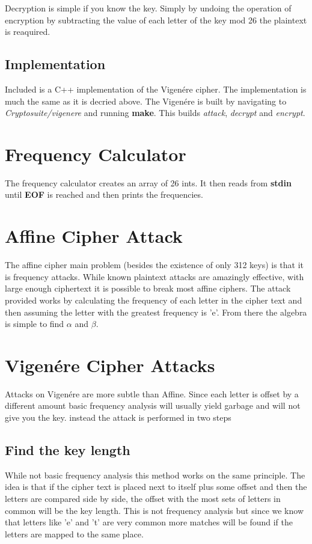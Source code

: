 Decryption is simple if you know the key. 
Simply by undoing the operation of encryption by subtracting the value of each letter of the key mod 26 the plaintext is reaquired.

\subsection{ Implementation}

Included is a C++ implementation of the Vigen\'ere cipher.
The implementation is much the same as it is decried above.
The Vigen\'ere is built by navigating to \textit{Cryptosuite/vigenere} and running \textbf{make}. This builds \textit{attack}, \textit{decrypt} and \textit{encrypt}.

\section{Frequency Calculator}
The frequency calculator creates an array of 26 ints. It then reads from \textbf{stdin} until \textbf{EOF} is reached and then prints the frequencies.

\section{Affine Cipher Attack}

The affine cipher main problem (besides the existence of only 312 keys) is that it is frequency attacks.
While known plaintext attacks are amazingly effective, with large enough ciphertext it is possible to break most affine ciphers.
The attack provided works by calculating the frequency of each letter in the cipher text and then assuming the letter with the greatest frequency is 'e'.
From there the algebra is simple to find $\alpha$ and $\beta$.


\section{Vigen\'ere Cipher Attacks}

Attacks on Vigen\'ere are more subtle than Affine.
Since each letter is offset by a different amount basic frequency analysis will usually yield garbage and will not give you the key.
instead the attack is performed in two steps

\subsection{Find the key length}
While not basic frequency analysis this method works on the same principle.
The idea is that if the cipher text is placed next to itself plus some offset and then the letters are compared side by side, 
the offset with the most sets of letters in common will be the key length.
This is not frequency analysis but since we know that letters like 'e' and 't' are very common more matches will be found if the letters are mapped to the same place.

